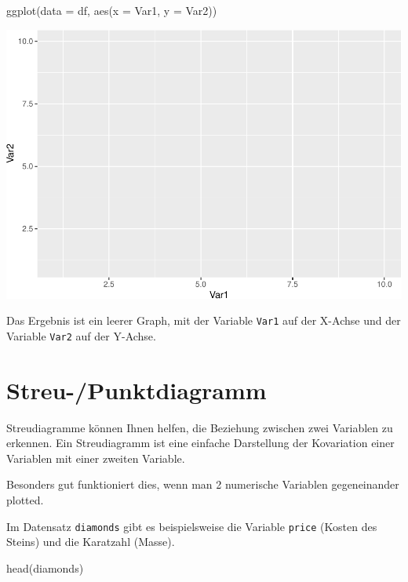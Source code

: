 \documentclass[
]{book}
\newenvironment{Shaded}{\begin{snugshade}}{\end{snugshade}}
\newcommand{\AttributeTok}[1]{\textcolor[rgb]{0.77,0.63,0.00}{#1}}
\newcommand{\FunctionTok}[1]{\textcolor[rgb]{0.00,0.00,0.00}{#1}}
\newcommand{\NormalTok}[1]{#1}
\begin{document}
\begin{Shaded}
\begin{Highlighting}[]
\FunctionTok{ggplot}\NormalTok{(}\AttributeTok{data =}\NormalTok{ df, }\FunctionTok{aes}\NormalTok{(}\AttributeTok{x =}\NormalTok{ Var1, }\AttributeTok{y =}\NormalTok{ Var2))}
\end{Highlighting}
\end{Shaded}

\includegraphics{CFH_R_bookdown_files/figure-latex/unnamed-chunk-152-1.pdf}

Das Ergebnis ist ein leerer Graph, mit der Variable \texttt{Var1} auf der X-Achse und der Variable \texttt{Var2} auf der Y-Achse.

\hypertarget{streu-punktdiagramm}{%
\section{Streu-/Punktdiagramm}\label{streu-punktdiagramm}}

Streudiagramme können Ihnen helfen, die Beziehung zwischen zwei Variablen zu erkennen. Ein Streudiagramm ist eine einfache Darstellung der Kovariation einer Variablen mit einer zweiten Variable.

Besonders gut funktioniert dies, wenn man 2 numerische Variablen gegeneinander plotted.

Im Datensatz \texttt{diamonds} gibt es beispielsweise die Variable \texttt{price} (Kosten des Steins) und die Karatzahl (Masse).

\begin{Shaded}
\begin{Highlighting}[]
\FunctionTok{head}\NormalTok{(diamonds)}
\end{Highlighting}
\end{Shaded}
\end{document}

